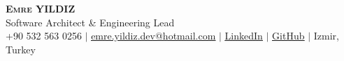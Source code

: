 \begin{center}
    \textbf{\Huge \scshape Emre YILDIZ} \\ \vspace{1pt}
    \small Software Architect \& Engineering Lead \\ \vspace{1pt}
    \small +90 532 563 0256 $|$ \href{mailto:emre.yildiz.dev@hotmail.com}{\underline{emre.yildiz.dev@hotmail.com}} $|$ 
    \href{https://linkedin.com/in/emre-yildiz-297ab0242}{\underline{LinkedIn}} $|$
    \href{https://github.com/emre-yildiz-dev}{\underline{GitHub}} $|$
    \small Izmir, Turkey
\end{center}